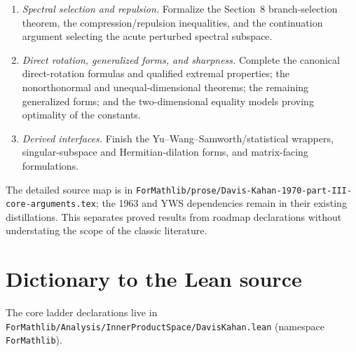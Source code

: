 \documentclass[11pt]{article}
\theoremstyle{remark}
\begin{document}
\begin{enumerate}
  unitarily invariant norm.  The largest unclosed pieces are the all-norm
  tangent families, the residual double-angle families, and general Schatten
  $p$ instances.
\item \emph{Spectral selection and repulsion.}
  Formalize the Section~8 branch-selection theorem, the compression/repulsion
  inequalities, and the continuation argument selecting the acute perturbed
  spectral subspace.
\item \emph{Direct rotation, generalized forms, and sharpness.}
  Complete the canonical direct-rotation formulas and qualified extremal
  properties; the nonorthonormal and unequal-dimensional theorems; the
  remaining generalized forms; and the two-dimensional equality models
  proving optimality of the constants.
\item \emph{Derived interfaces.}
  Finish the Yu--Wang--Samworth/statistical wrappers, singular-subspace and
  Hermitian-dilation forms, and matrix-facing formulations.
\end{enumerate}

The detailed source map is in
\texttt{ForMathlib/prose/Davis-Kahan-1970-part-III-core-arguments.tex}; the
1963 and YWS dependencies remain in their existing distillations.  This
separates proved results from roadmap declarations without understating the
scope of the classic literature.

\section{Dictionary to the Lean source}\label{sec:dictionary}

The core ladder declarations live in
\texttt{ForMathlib/Analysis/InnerProductSpace/DavisKahan.lean}
(namespace \texttt{ForMathlib}).
\end{document}
